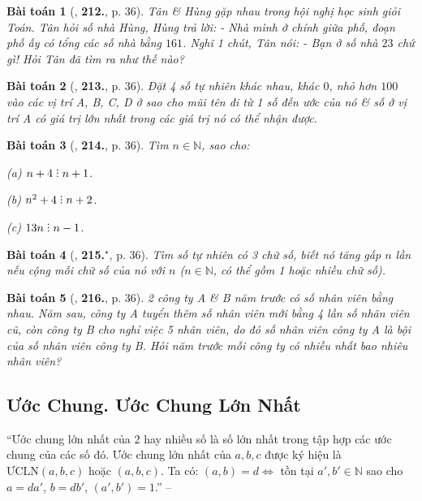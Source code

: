 \documentclass{article}
\numberwithin{equation}{section}
\newtheorem{baitoan}{Bài toán}[section]
\DeclareRobustCommand{\divby}{%
	\mathrel{\vbox{\baselineskip.65ex\lineskiplimit0pt\hbox{.}\hbox{.}\hbox{.}}}%
}
\begin{document}
\begin{baitoan}[\cite{Binh_Toan_6_tap_1}, \textbf{212.}, p. 36]
	Tân \& Hùng gặp nhau trong hội nghị học sinh giỏi Toán. Tân hỏi số nhà Hùng, Hùng trả lời: - Nhà mình ở chính giữa phố, đoạn phố ấy có tổng các số nhà bằng $161$. Nghĩ 1 chút, Tân nói: - Bạn ở số nhà $23$ chứ gì! Hỏi Tân đã tìm ra như thế nào?
\end{baitoan}

\begin{baitoan}[\cite{Binh_Toan_6_tap_1}, \textbf{213.}, p. 36]
	Đặt 4 số tự nhiên khác nhau, khác $0$, nhỏ hơn $100$ vào các vị trí A, B, C, D ở \cite[Hình 6, p. 36]{Binh_Toan_6_tap_1} sao cho mũi tên đi từ 1 số đến ước của nó \& số ở vị trí A có giá trị lớn nhất trong các giá trị nó có thể nhận được.
\end{baitoan}

\begin{baitoan}[\cite{Binh_Toan_6_tap_1}, \textbf{214.}, p. 36]
	Tìm $n\in\mathbb{N}$, sao cho:
	\begin{enumerate*}
		\item[(a)] $n + 4\divby n + 1$.
		\item[(b)] $n^2 + 4\divby n + 2$.
		\item[(c)] $13n\divby n - 1$.
	\end{enumerate*}
\end{baitoan}

\begin{baitoan}[\cite{Binh_Toan_6_tap_1}, \textbf{215.}${}^\star$, p. 36]
	Tìm số tự nhiên có 3 chữ số, biết nó tăng gấp $n$ lần nếu cộng mỗi chữ số của nó với $n$ ($n\in\mathbb{N}$, có thể gồm 1 hoặc nhiều chữ số).
\end{baitoan}

\begin{baitoan}[\cite{Binh_Toan_6_tap_1}, \textbf{216.}, p. 36]
	2 công ty A \& B năm trước có số nhân viên bằng nhau. Năm sau, công ty A tuyển thêm số nhân viên mới bằng 4 lần số nhân viên cũ, còn công ty B cho nghỉ việc 5 nhân viên, do đó số nhân viên công ty A là bội của số nhân viên công ty B. Hỏi năm trước mỗi công ty có nhiều nhất bao nhiêu nhân viên?
\end{baitoan}


\subsection{Ước Chung. Ước Chung Lớn Nhất}
``Ước chung lớn nhất của 2 hay nhiều số là số lớn nhất trong tập hợp các ước chung của các số đó. Ước chung lớn nhất của $a,b,c$ được ký hiệu là $\mbox{ƯCLN}(a,b,c)$ hoặc $(a,b,c)$. Ta có: $(a,b) = d\Leftrightarrow$ tồn tại $a',b'\in\mathbb{N}$ sao cho $a = da'$, $b = db'$, $(a',b') = 1$.'' -- \cite[\S9, p. 36]{Binh_Toan_6_tap_1}
\end{document}
